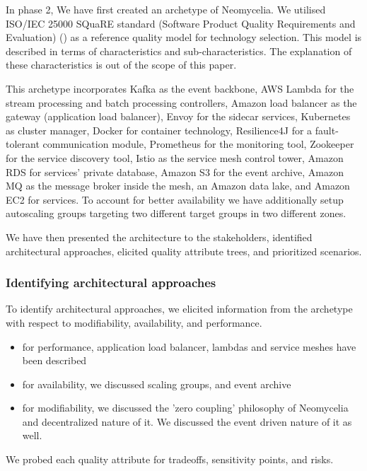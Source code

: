 \documentclass[10pt, conference]{IEEEtran}
\begin{document}
In phase 2, We have first created an archetype of Neomycelia. We utilised ISO/IEC 25000 SQuaRE standard (Software Product Quality Requirements and Evaluation) (\cite{Iso}) as a reference quality model for technology selection. This model is described in terms of characteristics and sub-characteristics. The explanation of these characteristics is out of the scope of this paper.

This archetype incorporates Kafka as the event backbone, AWS Lambda for the stream processing and batch processing controllers, Amazon load balancer as the gateway (application load balancer), Envoy for the sidecar services, Kubernetes as cluster manager, Docker for container technology, Resilience4J for a fault-tolerant communication module, Prometheus for the monitoring tool, Zookeeper for the service discovery tool, Istio as the service mesh control tower, Amazon RDS for services' private database, Amazon S3 for the event archive, Amazon MQ as the message broker inside the mesh, an Amazon data lake, and Amazon EC2 for services. To account for better availability we have additionally setup autoscaling groups targeting two different target groups in two different zones.

We have then presented the architecture to the stakeholders, identified architectural approaches, elicited quality attribute trees, and prioritized scenarios.

\subsubsection{Identifying architectural approaches}

To identify architectural approaches, we elicited information from the archetype with respect to modifiability, availability, and performance.

\begin{itemize}
    \item for performance, application load balancer, lambdas and service meshes have been described
    \item for availability, we discussed scaling groups, and event archive
    \item for modifiability, we discussed the 'zero coupling' philosophy of Neomycelia and decentralized nature of it. We discussed the event driven nature of it as well.
\end{itemize}

We probed each quality attribute for tradeoffs, sensitivity points, and risks.
\end{document}
